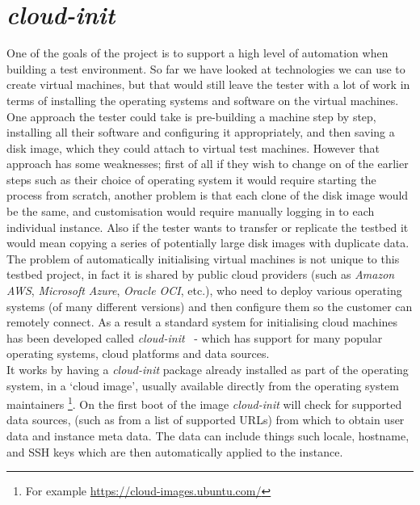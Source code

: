 \documentclass[
    author={Jacob Daniel Halsey},
    supervisor={Prof. Awais Rashid},
    degree={BSc},
    title={Building a Testbed for Evaluating Privacy Enhancing Technologies  (PETs)},
    subtitle={},
    type={software development},
    year={2021}
]{dissertation}
\begin{document}
\section{\emph{cloud-init}}
\label{sect:cloud-init-background}

One of the goals of the project is to support a high level of automation when building a 
test environment. So far we have looked at technologies we can use to create virtual machines,
but that would still leave the tester with a lot of work in terms of installing the operating
systems and software on the virtual machines. \\

One approach the tester could take is pre-building a machine step by step,
installing all their software and configuring it appropriately, and then saving
a disk image, which they could attach to virtual test machines. However that approach 
has some weaknesses; first of all if they wish to change on of the earlier steps
such as their choice of operating system it would require starting the process from scratch,
another problem is that each clone of the disk image would be the same, and customisation
would require manually logging in to each individual instance.
Also if the tester wants to transfer or replicate the testbed it would mean copying
a series of potentially large disk images with duplicate data. \\

The problem of automatically initialising virtual machines is not unique to this testbed project,
in fact it is shared by public cloud providers (such as \emph{Amazon AWS}, \emph{Microsoft Azure},
\emph{Oracle OCI}, etc.), who need to deploy various operating systems (of many different versions)
and then configure them so the customer can remotely connect.
As a result a standard system for initialising cloud machines has
been developed called \emph{cloud-init}~\cite{cloud_init} - which has support for many popular operating systems,
cloud platforms and data sources. \\

It works by having a \emph{cloud-init} package already installed as part of the operating system,
in a `cloud image', usually available directly from the operating system maintainers
\footnote{For example \url{https://cloud-images.ubuntu.com/}}.
On the first boot of the image \emph{cloud-init} will check for supported data sources,
(such as from a list of supported URLs) from which to obtain user data and instance meta data.
The data can include things such locale, hostname, and SSH keys which are then automatically
applied to the instance.
\end{document}
